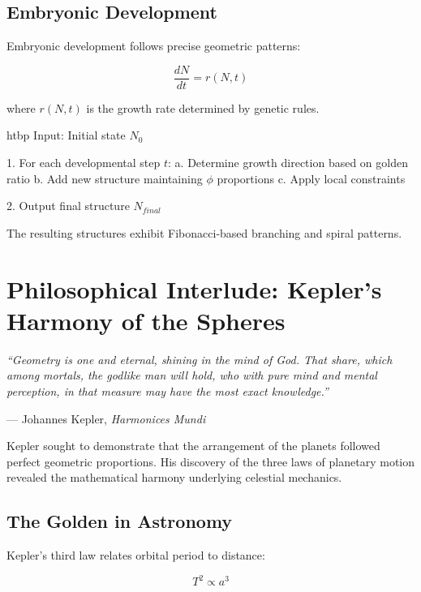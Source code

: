 \subsection{Embryonic Development}

Embryonic development follows precise geometric patterns:

\begin{equation}
\frac{dN}{dt} = r(N, t)
\end{equation}

where $r(N, t)$ is the growth rate determined by genetic rules.

\begin{algorithm}{htbp}\label{algo:golden-growth}
\label{algo:golden-growth}
Input: Initial state $N_0$

1. For each developmental step $t$:
   a. Determine growth direction based on golden ratio
   b. Add new structure maintaining $\phi$ proportions
   c. Apply local constraints

2. Output final structure $N_{final}$

The resulting structures exhibit Fibonacci-based branching and spiral patterns.
\end{algorithm}

\section{Philosophical Interlude: Kepler's Harmony of the Spheres}

\textit{``Geometry is one and eternal, shining in the mind of God. That share, which among mortals, the godlike man will hold, who with pure mind and mental perception, in that measure may have the most exact knowledge.''}
\begin{flushright}
— Johannes Kepler, \textit{Harmonices Mundi}
\end{flushright}

Kepler sought to demonstrate that the arrangement of the planets followed perfect geometric proportions. His discovery of the three laws of planetary motion revealed the mathematical harmony underlying celestial mechanics.

\subsection{The Golden in Astronomy}

Kepler's third law relates orbital period to distance:

\begin{equation}
T^2 \propto a^3
\end{equation}

